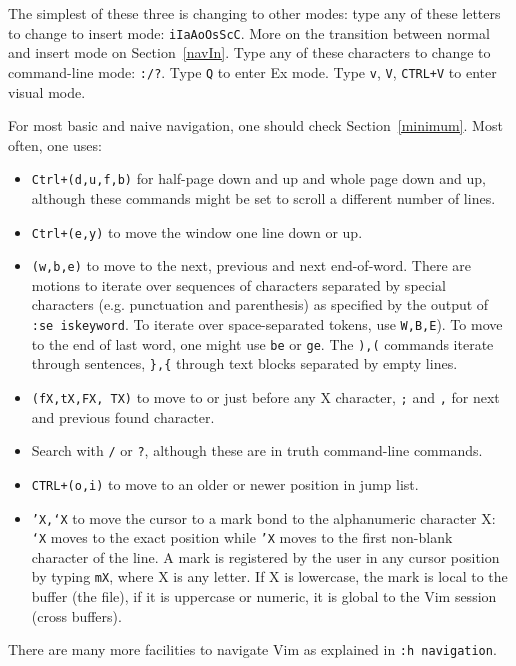 \documentclass{article}
\newcommand{\tttt}[1]{\texttt{#1}}
\begin{document}
The simplest of these three is changing to other modes:
type any of these letters to change to insert mode:
\texttt{iIaAoOsScC}. More on the transition between
normal and insert mode on Section~\ref{navIn}.
Type any of these characters to change to command-line mode:
\texttt{:/?}.
Type \texttt{Q} to enter Ex mode.
Type \texttt{v}, \texttt{V}, \texttt{CTRL+V} to enter visual mode.

For most basic and naive navigation, one should check Section~\ref{minimum}.
Most often, one uses:
\begin{itemize}
  \item \texttt{Ctrl+(d,u,f,b)} for half-page down and up
and whole page down and up, although these commands might
be set to scroll a different number of lines.
  \item \texttt{Ctrl+(e,y)} to move the window one line down or up.
  \item \texttt{(w,b,e)} to move to the next, previous and next end-of-word.
    There are motions to iterate over sequences of characters separated
    by special characters (e.g. punctuation and parenthesis) as
    specified by the output of \texttt{:se iskeyword}.
    To iterate over space-separated tokens, use \texttt{W,B,E}).
    To move to the end of last word, one might use \texttt{be}
    or \texttt{ge}.
The \texttt{),(} commands iterate through sentences,
		\tttt{\},\{} through text blocks separated by empty lines.
  \item \texttt{(fX,tX,FX, TX)} to move to or just before any X character,
	  \tttt{;} and \tttt{,} for next and previous found character.
  \item Search with \tttt{/} or \tttt{?}, although these are in truth command-line commands.
  \item \texttt{CTRL+(o,i)} to move to an older or newer position in
    jump list.
  \item \texttt{'X,`X} to move the cursor to a mark bond to the alphanumeric character X: \texttt{`X} moves to the exact position while \texttt{'X} moves to
    the first non-blank character of the line.
    A mark is registered by the user in any cursor position
    by typing \texttt{mX}, where X is any letter.
    If X is lowercase, the mark is local to the buffer (the file),
    if it is uppercase or numeric, it is global to the Vim session
    (cross buffers).
\end{itemize}

There are many more facilities to navigate Vim
as explained in \texttt{:h navigation}.
\end{document}
